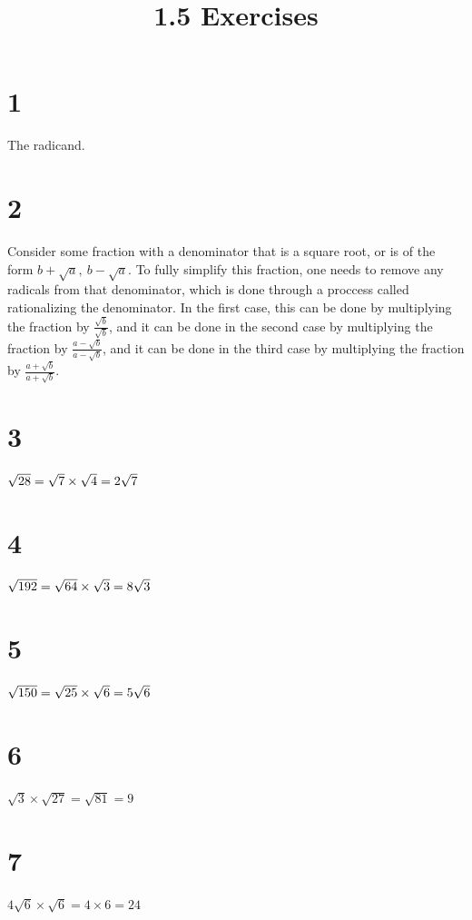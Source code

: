 \documentclass{article}
\title{1.5 Exercises}
\theoremstyle{definition}
\begin{document}
\maketitle

\section*{1}
The radicand.

\section*{2}
Consider some fraction with a denominator that is a square root, or is of the form $b+\sqrt{a},\ b-\sqrt{a}$. To fully simplify this fraction, one needs 
to remove any radicals from that denominator, which is done through a proccess called rationalizing the denominator. In the first case, this can be done 
by multiplying the fraction by $\frac{\sqrt{b}}{\sqrt{b}}$, and it can be done in the second case by multiplying the fraction by $\frac{a-\sqrt{b}}{a-\sqrt{
b}}$, and it can be done in the third case by multiplying the fraction by $\frac{a+\sqrt{b}}{a+\sqrt{b}}$.

\section*{3}
$\sqrt{28}=\sqrt{7}\times \sqrt{4}\newline =2\sqrt{7}$

\section*{4}
$\sqrt{192}=\sqrt{64}\times \sqrt{3}\newline =8\sqrt{3}$

\section*{5}
$\sqrt{150}=\sqrt{25}\times \sqrt{6}\newline =5\sqrt{6}$

\section*{6}
$\sqrt{3}\times \sqrt{27}=\sqrt{81}=9$

\section*{7}
$4\sqrt{6}\times \sqrt{6}=4\times 6=24$
\end{document}
